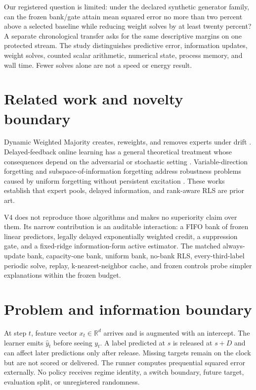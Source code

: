 \documentclass[10pt]{article}
\begin{document}
Our registered question is limited: under the declared synthetic generator family, can the frozen bank/gate attain mean squared error no more than two percent above a selected baseline while reducing weight solves by at least twenty percent? A separate chronological transfer asks for the same descriptive margins on one protected stream. The study distinguishes predictive error, information updates, weight solves, counted scalar arithmetic, numerical state, process memory, and wall time. Fewer solves alone are not a speed or energy result.

\section{Related work and novelty boundary}
Dynamic Weighted Majority creates, reweights, and removes experts under drift \cite{dwm}. Delayed-feedback online learning has a general theoretical treatment whose consequences depend on the adversarial or stochastic setting \cite{delay}. Variable-direction forgetting and subspace-of-information forgetting address robustness problems caused by uniform forgetting without persistent excitation \cite{vdf,sift}. These works establish that expert pools, delayed information, and rank-aware RLS are prior art.

V4 does not reproduce those algorithms and makes no superiority claim over them. Its narrow contribution is an auditable interaction: a FIFO bank of frozen linear predictors, legally delayed exponentially weighted credit, a suppression gate, and a fixed-ridge information-form active estimator. The matched always-update bank, capacity-one bank, uniform bank, no-bank RLS, every-third-label periodic solve, replay, k-nearest-neighbor cache, and frozen controls probe simpler explanations within the frozen budget.

\section{Problem and information boundary}
At step $t$, feature vector $x_t\in\mathbb{R}^d$ arrives and is augmented with an intercept. The learner emits $\hat y_t$ before seeing $y_t$. A label predicted at $s$ is released at $s+D$ and can affect later predictions only after release. Missing targets remain on the clock but are not scored or delivered. The runner computes prequential squared error externally. No policy receives regime identity, a switch boundary, future target, evaluation split, or unregistered randomness.
\end{document}
